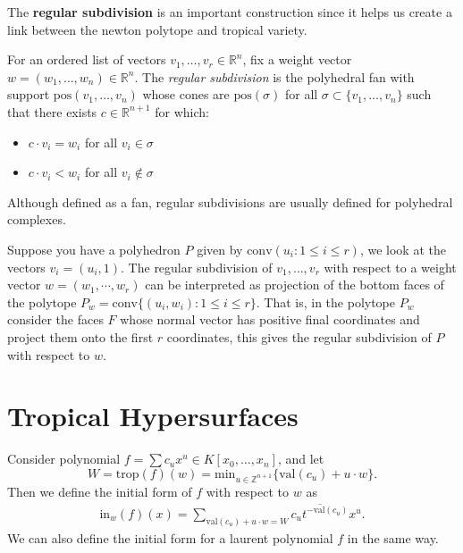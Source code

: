     The \textbf{regular subdivision} is an important construction since it helps us create a link between the newton polytope and tropical variety. 
    \begin{definition}
    For an ordered list of vectors $v_1,\dots, v_r \in \mathbb{R}^{n}$, fix a weight vector $w = (w_1,\dots,w_n) \in \mathbb{R}^{n}$. 
    The \textit{regular subdivision} is the polyhedral fan with support $\text{pos}(v_1,\dots,v_n)$ whose cones are $\text{pos}(\sigma)$ for all $\sigma \subset \{v_1,\dots,v_n\}$ such that there exists $c \in \mathbb{R}^{n+1}$ for which:
    \begin{itemize}
        \item $c \cdot v_i = w_i$ for all $v_{i}\in \sigma$ 
        \item $c \cdot v_i < w_i$ for all $v_i \not\in \sigma$
    \end{itemize}
    Although defined as a fan, regular subdivisions are usually defined for polyhedral complexes.
    \end{definition}
    Suppose you have a polyhedron $P$ given by $\text{conv}(u_i: 1\leq i\leq r)$, we look at the vectors $v_i = (u_i,1)$. 
    The regular subdivision of $v_1,\dots,v_r$ with respect to a weight vector $w = (w_1, \cdots, w_r)$ can be interpreted as projection of the bottom faces of the polytope $P_w = \text{conv}\{(u_i,w_i): 1\leq i\leq r\}$. 
    That is, in the polytope $P_w$ consider the faces $F$ whose normal vector has positive final coordinates and project them onto the first $r$ coordinates, this gives the regular subdivision of $P$ with respect to $w$.

\section{Tropical Hypersurfaces}

    \begin{definition}
        Consider polynomial $f = \sum c_u x^u \in K[x_0,\dots,x_n]$, and let
        \[
            W = \text{trop}(f)(w) = \text{min}_{u \in \mathbb{Z}^{n+1}}\{\text{val}(c_u) + u\cdot w\}.
        \]
        Then we define the initial form of $f$ with respect to $w$ as
        \begin{align*}
            \text{in}_{w}(f)(x) = \sum_{\text{val}(c_u) + u\cdot w = W} \overline{c_u t^{-\text{val}(c_u)}} x^u.
        \end{align*}
        We can also define the initial form for a laurent polynomial $f$ in the same way.
    \end{definition}

